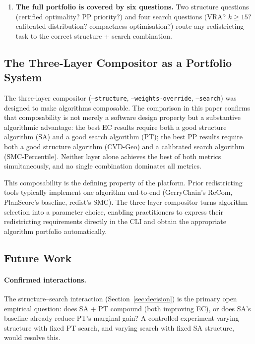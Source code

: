 \begin{enumerate}
  \item \textbf{The full portfolio is covered by six questions.}
        Two structure questions (certified optimality? PP priority?) and
        four search questions (VRA? $k \geq 15$? calibrated distribution?
        compactness optimisation?) route any redistricting task to the
        correct structure + search combination.

\end{enumerate}

\subsection{The Three-Layer Compositor as a Portfolio System}

The three-layer compositor (\texttt{--structure}, \texttt{--weights-override},
\texttt{--search}) was designed to make algorithms composable.
The comparison in this paper confirms that composability is not merely
a software design property but a substantive algorithmic advantage:
the best EC results require both a good structure algorithm (SA) and a
good search algorithm (PT); the best PP results require both a good structure
algorithm (CVD-Geo) and a calibrated search algorithm (SMC-Percentile).
Neither layer alone achieves the best of both metrics simultaneously, and
no single combination dominates all metrics.

This composability is the defining property of the platform.
Prior redistricting tools typically implement one algorithm end-to-end
(GerryChain's ReCom, PlanScore's baseline, redist's SMC).
The three-layer compositor turns algorithm selection into a parameter choice,
enabling practitioners to express their redistricting requirements directly
in the CLI and obtain the appropriate algorithm portfolio automatically.

\subsection{Future Work}

\paragraph{Confirmed interactions.}
The structure--search interaction (Section~\ref{sec:decision}) is the primary
open empirical question: does SA + PT compound (both improving EC), or does
SA's baseline already reduce PT's marginal gain?
A controlled experiment varying structure with fixed PT search, and varying
search with fixed SA structure, would resolve this.

